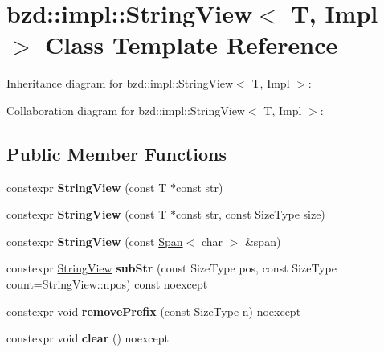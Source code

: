 \hypertarget{classbzd_1_1impl_1_1StringView}{}\section{bzd\+:\+:impl\+:\+:String\+View$<$ T, Impl $>$ Class Template Reference}
\label{classbzd_1_1impl_1_1StringView}


Inheritance diagram for bzd\+:\+:impl\+:\+:String\+View$<$ T, Impl $>$\+:


Collaboration diagram for bzd\+:\+:impl\+:\+:String\+View$<$ T, Impl $>$\+:
\subsection*{Public Member Functions}
\begin{DoxyCompactItemize}
\item 
\mbox{\label{classbzd_1_1impl_1_1StringView_a622594a6e3e125f2fad0326208302e45}} 
constexpr {\bfseries String\+View} (const T $\ast$const str)
\item 
\mbox{\label{classbzd_1_1impl_1_1StringView_abef51a35705e90a868115e1a44f07e00}} 
constexpr {\bfseries String\+View} (const T $\ast$const str, const Size\+Type size)
\item 
\mbox{\label{classbzd_1_1impl_1_1StringView_a5b2c721a7d0311977c069f276d602f3d}} 
constexpr {\bfseries String\+View} (const \hyperlink{classbzd_1_1Span}{Span}$<$ char $>$ \&span)
\item 
\mbox{\label{classbzd_1_1impl_1_1StringView_aeaf63362ef7e442bc812546e2c406d60}} 
constexpr \hyperlink{classbzd_1_1impl_1_1StringView}{String\+View} {\bfseries sub\+Str} (const Size\+Type pos, const Size\+Type count=String\+View\+::npos) const noexcept
\item 
\mbox{\label{classbzd_1_1impl_1_1StringView_a7783e9feca157de4018776146e7b6616}} 
constexpr void {\bfseries remove\+Prefix} (const Size\+Type n) noexcept
\item 
\mbox{\label{classbzd_1_1impl_1_1StringView_a427f7bd440c4fd3e87be51418eede0ec}} 
constexpr void {\bfseries clear} () noexcept
\end{DoxyCompactItemize}
